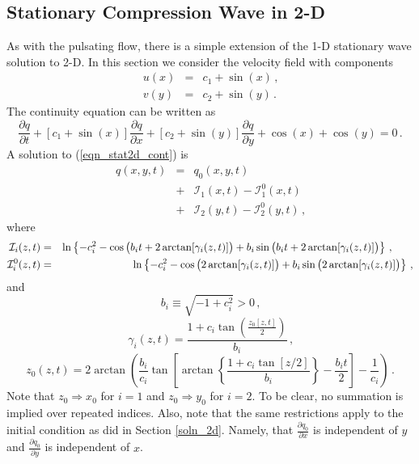 \documentclass[11pt]{book}
\begin{document}
\subsection{Stationary Compression Wave in 2-D}
\label{stationary_2d}

As with the pulsating flow, there is a simple extension of the 1-D stationary wave solution to 2-D.  In this section we consider the velocity field with components
\begin{eqnarray}
u(x) &=& c_1 + \sin(x) \,\mbox{,} \\
v(y) &=& c_2 + \sin(y) \,\mbox{.}
\end{eqnarray}
The continuity equation can be written as
\begin{equation}
\label{eqn_stat2d_cont}
\frac{\partial q}{\partial t} + [c_1 + \sin(x)] \frac{\partial q}{\partial x} + [c_2 + \sin(y)] \frac{\partial q}{\partial y} + \cos(x) + \cos(y) = 0 \,\mbox{.}
\end{equation}
A solution to (\ref{eqn_stat2d_cont}) is
\begin{eqnarray}
\label{eqn_stat2d_soln}
q(x,y,t) &=& q_0(x,y,t) \nonumber\\
&+& \mathcal{I}_1(x,t) - \mathcal{I}_1^0(x,t) \nonumber\\
&+& \mathcal{I}_2(y,t) - \mathcal{I}_2^0(y,t) \,\mbox{,}
\end{eqnarray}
where
\begin{eqnarray}
\label{eqn_Ii}
\mathcal{I}_i(z,t) &=& \ln\left\{ -c_i^2 - \cos\big(b_i t + 2\arctan[\gamma_i(z,t)] \big) + b_i \sin\big(b_i t + 2\arctan[\gamma_i(z,t)] \big) \right\}\,\mbox{,} \quad\quad  \vspace{0.3cm}\\
\label{eqn_Ii0}
\mathcal{I}_i^0(z,t) &=& \ln\left\{ -c_i^2 - \cos\big(2\arctan[\gamma_i(z,t)] \big) + b_i \sin\big(2\arctan[\gamma_i(z,t)] \big) \right\} \,\mbox{,}
\end{eqnarray}
and
\begin{equation}
b_i \equiv \sqrt{-1 + c_i^2} >0 \,\mbox{,}
\end{equation}
\begin{equation}
\gamma_i(z,t) = \frac{ 1 + c_i \tan\left( \frac{z_0[z,t]}{2} \right) }{b_i} \,\mbox{,}
\end{equation}
\begin{equation}
z_0(z,t) = 2\arctan\left( \frac{b_i}{c_i} \tan \left[ \arctan\left\{ \frac{1+c_i\tan[z/2]}{b_i} \right\} - \frac{b_it}{2} \right] - \frac{1}{c_i} \right) \,\mbox{.}
\end{equation}
Note that $z_0 \Rightarrow x_0$ for $i=1$ and $z_0 \Rightarrow y_0$ for $i=2$.  To be clear, no summation is implied over repeated indices. Also, note that the same restrictions apply to the initial condition as did in Section \ref{soln_2d}. Namely, that $\frac{\partial q_0}{\partial x}$ is independent of $y$ and $\frac{\partial q_0}{\partial y}$ is independent of $x$.
\end{document}
